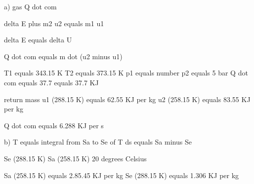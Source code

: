 a) gas Q dot com

delta E plus m2 u2 equals m1 u1

delta E equals delta U

Q dot com equals m dot (u2 minus u1)

T1 equals 343.15 K
T2 equals 373.15 K
p1 equals number
p2 equals 5 bar
Q dot com equals 37.7 equals 37.7 KJ

return mass
u1 (288.15 K) equals 62.55 KJ per kg
u2 (258.15 K) equals 83.55 KJ per kg

Q dot com equals 6.288 KJ per s

b) T equals integral from Sa to Se of T ds
equals Sa minus Se

Se (288.15 K)
Sa (258.15 K) 20 degrees Celsius

Sa (258.15 K) equals 2.85.45 KJ per kg
Se (288.15 K) equals 1.306 KJ per kg
